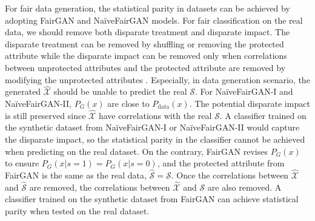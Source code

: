 \documentclass[sigconf]{acmart}
\theoremstyle{definition}
\begin{document}
For fair data generation, the statistical parity in datasets can be achieved by adopting FairGAN and Na\"iveFairGAN models. For fair classification on the real data, we should remove both disparate treatment and disparate impact. The disparate treatment can be removed by shuffling or removing the protected attribute while the disparate impact can be removed only when correlations between unprotected attributes and the protected attribute are removed by modifying the unprotected attributes \cite{Feldman2015Certifying}. Especially, in data generation scenario, the generated $\hat{\mathcal{X}}$ should be unable to predict the real $\mathcal{S}$. For Na\"iveFairGAN-I and Na\"iveFairGAN-II, $P_G(x)$ are close to $P_{\text{data}}(x)$. The potential disparate impact  is still preserved since $\hat{\mathcal{X}}$ have correlations with the real $\mathcal{S}$. A classifier trained on the synthetic dataset from Na\"iveFairGAN-I or Na\"iveFairGAN-II would capture the disparate impact, so the statistical parity in the classifier cannot be achieved when predicting on the real dataset. On the contrary, FairGAN revises $P_G(x)$  to ensure $P_G(x|s=1)=P_G(x|s=0)$, and the protected attribute from FairGAN is the same as the real data, $\hat{\mathcal{S}} = \mathcal{S}$. Once the correlations between $\hat{\mathcal{X}}$ and $\hat{\mathcal{S}}$ are removed, the correlations between $\hat{\mathcal{X}}$ and $\mathcal{S}$ are also removed. A classifier trained on the synthetic dataset from FairGAN can achieve statistical parity when tested on the real dataset.
\end{document}
